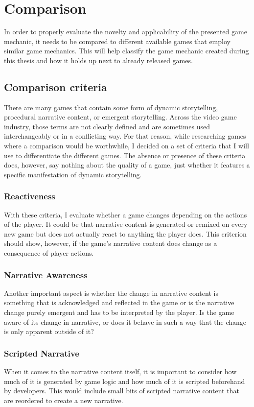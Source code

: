 \chapter{Comparison} %
In order to properly evaluate the novelty and applicability of the presented game mechanic, it needs to be compared to different available games that employ similar game mechanics. This will help classify the game mechanic created during this thesis and how it holds up next to already released games.
\section{Comparison criteria}
There are many games that contain some form of dynamic storytelling, procedural narrative content, or emergent storytelling. Across the video game industry, those terms are not clearly defined and are sometimes used interchangeably or in a conflicting way. For that reason, while researching games where a comparison would be worthwhile, I decided on a set of criteria that I will use to differentiate the different games. The absence or presence of these criteria does, however, say nothing about the quality of a game, just whether it features a specific manifestation of dynamic storytelling.
\subsection{Reactiveness}
With these criteria, I evaluate whether a game changes depending on the actions of the player. It could be that narrative content is generated or remixed on every new game but does not actually react to anything the player does. This criterion should show, however, if the game’s narrative content does change as a consequence of player actions.
\subsection{Narrative Awareness}
Another important aspect is whether the change in narrative content is something that is acknowledged and reflected in the game or is the narrative change purely emergent and has to be interpreted by the player. Is the game aware of its change in narrative, or does it behave in such a way that the change is only apparent outside of it?
\subsection{Scripted Narrative}
When it comes to the narrative content itself, it is important to consider how much of it is generated by game logic and how much of it is scripted beforehand by developers. This would include small bits of scripted narrative content that are reordered to create a new narrative.
